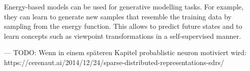 Energy-based models can be used for generative modelling tasks. For example, they can learn to generate new samples that resemble the training data by sampling from the energy function. This allows to predict future states and to learn concepts such as viewpoint transformations in a self-supervised manner.






---
TODO: Wenn in einem späteren Kapitel probablistic neuron motiviert wird: https://cerenaut.ai/2014/12/24/sparse-distributed-representations-sdrs/
 





